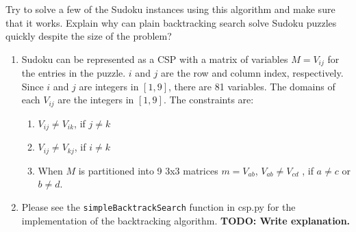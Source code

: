 \documentclass[12pt]{article}
\newenvironment{problem}[2][Problem]{\begin{trivlist}
\item[\hskip \labelsep {\bfseries #1}\hskip \labelsep {\bfseries #2.}]}{\end{trivlist}}
\begin{document}
\begin{problem}{2}
\begin{enumerate}
			Try to solve a few of the Sudoku instances using this algorithm and make sure that it works.
			Explain why can plain backtracking search solve Sudoku puzzles quickly despite the size of the problem?
	\end{enumerate}
	\begin{enumerate}
		\item Sudoku can be represented as a CSP with a matrix of variables $M=V_{ij}$ for the entries in the puzzle.
			$i$ and $j$ are the row and column index, respectively.
			Since $i$ and $j$ are integers in $[1,9]$, there are 81 variables.
			The domains of each $V_{ij}$ are the integers in $[1,9]$.
			The constraints are:
			\begin{enumerate}
				\item $V_{ij} \neq V_{ik}$, if $j \neq k$
				\item $V_{ij} \neq V_{kj}$, if $i \neq k$
				\item When $M$ is partitioned into 9 3x3 matrices $m = V_{ab}$, $V_{ab} \neq V_{cd}$ , if $a \neq c$ or $b \neq d$.
			\end{enumerate}
		\item Please see the \texttt{simpleBacktrackSearch} function in csp.py for the implementation of the backtracking algorithm.
			\textbf{TODO: Write explanation.}
	\end{enumerate}
\end{problem}
\end{document}
